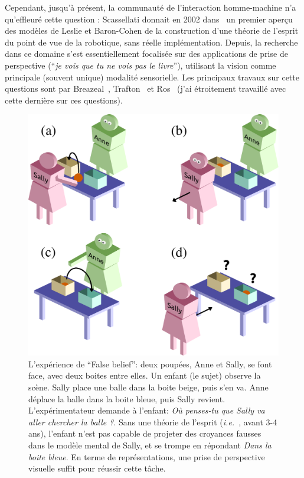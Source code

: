\documentclass[a4paper]{article}
\newcommand{\ie}{{\textit{i.e.~}}}
\begin{document}
Cependant, jusqu'à présent, la communauté de l'interaction homme-machine n'a
qu'effleuré cette question : Scassellati donnait en 2002
dans~\cite{scassellati2002theory} un premier aperçu des modèles de Leslie et
Baron-Cohen de la construction d'une théorie de l'esprit du point de vue de la
robotique, sans réelle implémentation. Depuis, la recherche dans ce domaine
s'est essentiellement focalisée sur des applications de prise de perspective
(``\emph{je vois que tu ne vois pas le livre}''), utilisant la vision comme
principale (souvent unique) modalité sensorielle. Les principaux travaux sur
cette questions sont par Breazeal~\cite{breazeal2006using},
Trafton~\cite{Trafton2005} et Ros~\cite{Ros2010} (j'ai étroitement travaillé
avec cette dernière sur ces questions).

\begin{figure}[h!t]
        \centering
        \includegraphics[width=0.7\linewidth]{sally_ann}
        \caption{\small L'expérience de ``False belief'': deux poupées, Anne
            et Sally, se font face, avec deux boites entre elles. Un enfant
            (le sujet) observe la scène. Sally place une balle dans la boite
            beige, puis s'en va. Anne déplace la balle dans la boite bleue, puis
            Sally revient. L'expérimentateur demande à l'enfant: \emph{Où
            penses-tu que Sally va aller chercher la balle ?}. Sans une théorie
            de l'esprit (\ie, avant 3-4 ans), l'enfant n'est pas capable de
            projeter des croyances fausses dans le modèle mental de Sally, et se
            trompe en répondant \emph{Dans la boite bleue}. En terme de
            représentations, une prise de perspective visuelle suffit pour
            réussir cette tâche.}
        \label{false-beliefs}
\end{figure}
\end{document}
